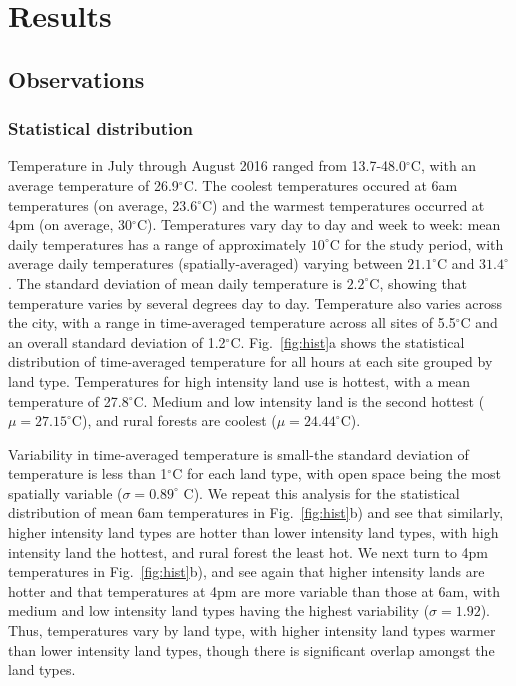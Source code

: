 \documentclass[draft,linenumbers]{agujournal}
\begin{document}
\section{Results}\label{sec:results} 
\subsection{Observations}
\subsubsection{Statistical distribution}
Temperature in July through August 2016 ranged from 13.7-48.0$^\circ$C, with an average temperature of 26.9$^\circ$C. The coolest temperatures occured at 6am temperatures (on average, 23.6$^\circ$C) and the warmest temperatures occurred at 4pm (on average,  30$^\circ$C). 
Temperatures vary day to day and week to week: mean daily temperatures has a range of approximately $10^\circ$C for the study period, with average daily temperatures (spatially-averaged) varying between $21.1^\circ$C and $31.4^\circ$. The standard deviation of mean daily temperature is $2.2^\circ$C, showing that temperature varies by several degrees day to day. 
Temperature also varies across the city, with a range in time-averaged temperature across all sites of 5.5$^\circ$C and an overall standard deviation of 1.2$^\circ$C. Fig.~\ref{fig:hist}a shows the statistical distribution of time-averaged temperature for all hours at each site grouped by land type. 
Temperatures %
for high intensity land use is hottest, with a mean temperature of 27.8$^\circ$C. Medium and low intensity land is the second hottest ($\mu = 27.15^\circ$C), and rural forests are coolest ($\mu = 24.44^\circ$C). 

Variability in time-averaged temperature is small-the standard deviation of temperature is less than 1$^\circ$C for each land type, with open space being the most spatially variable ($\sigma = 0.89^\circ$ C). We repeat this analysis for the statistical distribution of mean 6am temperatures in Fig.~\ref{fig:hist}b) and see that similarly, higher intensity land types are hotter than lower intensity land types, with high intensity land the hottest, and rural forest the least hot. We next turn to 4pm temperatures in Fig.~\ref{fig:hist}b), and see again that higher intensity lands are hotter and that temperatures at 4pm are more variable than those at 6am, with medium and low intensity land types having the highest variability ($\sigma = 1.92$). 
Thus, temperatures vary by land type, with higher intensity land types  warmer than lower intensity land types, 
though there is significant overlap amongst the land types.
\end{document}
